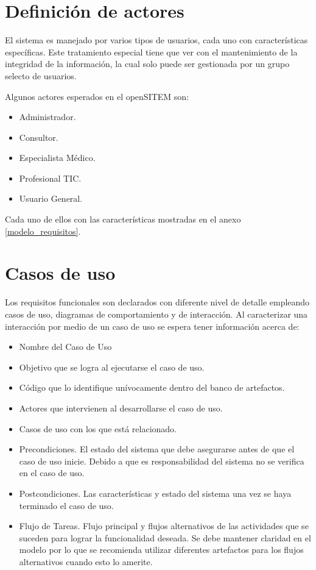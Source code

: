 \section{Definición de actores}

El sistema es manejado por varios tipos de usuarios, cada uno con características específicas. Este tratamiento especial tiene que ver con el mantenimiento de la integridad de la información, la cual solo puede ser gestionada por un grupo selecto de usuarios. 

Algunos actores esperados en el openSITEM son:

\begin{itemize}
\item Administrador.
\item Consultor.
\item Especialista Médico.
\item Profesional TIC.
\item Usuario General.
\end{itemize}

Cada uno de ellos con las características mostradas en el anexo \ref{modelo_requisitos}.

\section{Casos de uso}

Los requisitos funcionales son declarados con diferente nivel de detalle empleando casos de uso, diagramas de comportamiento y de interacción. Al caracterizar una interacción por medio de un caso de uso se espera tener información acerca de:

\begin{itemize}
\item Nombre del Caso de Uso
\item Objetivo que se logra al ejecutarse el caso de uso.
\item Código que lo identifique unívocamente dentro del banco de artefactos.
\item Actores que intervienen al desarrollarse el caso de uso.
\item Casos de uso con los que está relacionado.
\item Precondiciones.  El estado del sistema que debe asegurarse antes de que el caso de uso inicie. Debido a que es responsabilidad del sistema no se verifica en el caso de uso.
\item Postcondiciones. Las características y estado del sistema una vez se haya terminado el caso de uso.
\item Flujo de Tareas. Flujo principal y flujos alternativos de las actividades que se suceden para lograr la funcionalidad deseada. Se debe mantener claridad en el modelo por lo que se recomienda utilizar diferentes artefactos para los flujos alternativos cuando esto lo amerite.
\end{itemize}

